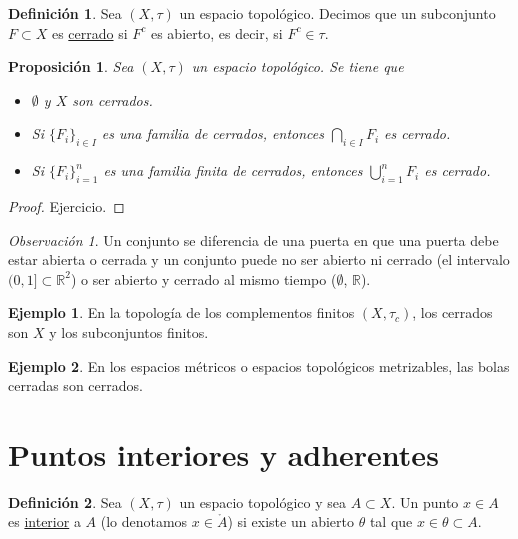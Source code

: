 \documentclass[12pt]{report}
\newtheorem{proposition}{Proposición}[chapter]
\theoremstyle{definition}
\newtheorem{definition}{Definición}[chapter]
\theoremstyle{definition}
\newtheorem{example}{Ejemplo}[chapter]
\theoremstyle{remark}
\newtheorem*{obs}{Observación} %
\newcommand{\R}{\mathbb R}
\begin{document}
\begin{definition}
Sea $(X,\tau)$ un espacio topológico. Decimos que un subconjunto $F \subset X$ es \underline{cerrado} si $F^c$ es abierto, es decir, si $F^c \in \tau$.
\end{definition}

\begin{proposition}
Sea $(X,\tau)$ un espacio topológico. Se tiene que
\begin{itemize}
    \item[(i)] $\emptyset$ y $X$ son cerrados.
    \item[(ii)] Si $\{F_i\}_{i \in I}$ es una familia de cerrados, entonces $\bigcap_{i \in I}F_i$ es cerrado.
    \item[(iii)] Si $\{F_i\}_{i=1}^n$ es una familia finita de cerrados, entonces $\bigcup_{i=1}^nF_i$ es cerrado.
\end{itemize}
\end{proposition}

\begin{proof}
Ejercicio.
\end{proof}

\begin{obs}
Un conjunto se diferencia de una puerta en que una puerta debe estar abierta o cerrada y un conjunto puede no ser abierto ni cerrado (el intervalo $(0,1] \subset \R^2$) o ser abierto y cerrado al mismo tiempo ($\emptyset$, $\R$).
\end{obs}

\begin{example}
En la topología de los complementos finitos $(X,\tau_c)$, los cerrados son $X$ y los subconjuntos finitos.
\end{example}

\begin{example}
En los espacios métricos o espacios topológicos metrizables, las bolas cerradas son cerrados.
\end{example}

\section{Puntos interiores y adherentes}

\begin{definition}
Sea $(X,\tau)$ un espacio topológico y sea $A \subset X$. Un punto $x \in A$ es \underline{interior} a $A$ (lo denotamos $x \in \mathring{A}$) si existe un abierto $\theta$ tal que $x \in \theta \subset A$.
\end{definition}
\end{document}
